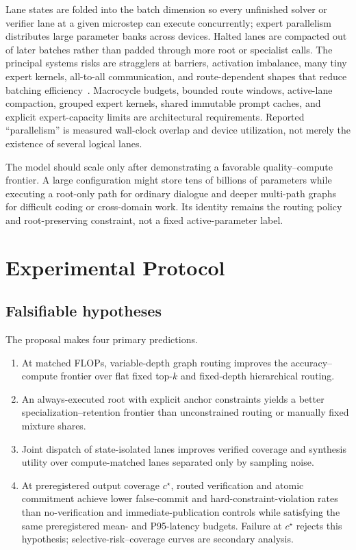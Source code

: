 \documentclass[10pt,a4paper]{article}
\begin{document}
Lane states are folded into the batch dimension so every unfinished solver or
verifier lane at a given microstep can execute concurrently; expert
parallelism distributes large parameter banks across devices. Halted lanes are
compacted out of later batches rather than padded through more root or
specialist calls. The principal systems risks are stragglers at barriers,
activation imbalance, many tiny expert kernels, all-to-all communication, and
route-dependent shapes that reduce batching
efficiency~\cite{lepikhin2021,fedus2022}. Macrocycle budgets, bounded route
windows, active-lane compaction, grouped expert kernels, shared immutable
prompt caches, and explicit expert-capacity limits are architectural
requirements. Reported ``parallelism'' is measured wall-clock overlap and
device utilization, not merely the existence of several logical lanes.

The model should scale only after demonstrating a favorable quality--compute
frontier. A large configuration might store tens of billions of parameters
while executing a root-only path for ordinary dialogue and deeper multi-path
graphs for difficult coding or cross-domain work. Its identity remains the
routing policy and root-preserving constraint, not a fixed active-parameter
label.
\section{Experimental Protocol}
\label{sec:protocol}

\subsection{Falsifiable hypotheses}

The proposal makes four primary predictions.

\begin{enumerate}[label=\textbf{H\arabic*.},leftmargin=2.8em]
\item At matched FLOPs, variable-depth graph routing improves the
  accuracy--compute frontier over flat fixed top-$k$ and fixed-depth
  hierarchical routing.
\item An always-executed root with explicit anchor constraints yields a better
  specialization--retention frontier than unconstrained routing or manually
  fixed mixture shares.
\item Joint dispatch of state-isolated lanes improves verified coverage and
  synthesis utility over compute-matched lanes separated only by sampling
  noise.
\item At preregistered output coverage $c^\star$, routed verification and
  atomic commitment achieve lower false-commit and hard-constraint-violation
  rates than no-verification and immediate-publication controls while
  satisfying the same preregistered mean- and P95-latency budgets. Failure at
  $c^\star$ rejects this hypothesis; selective-risk--coverage curves are
  secondary analysis.
\end{enumerate}
\end{document}

